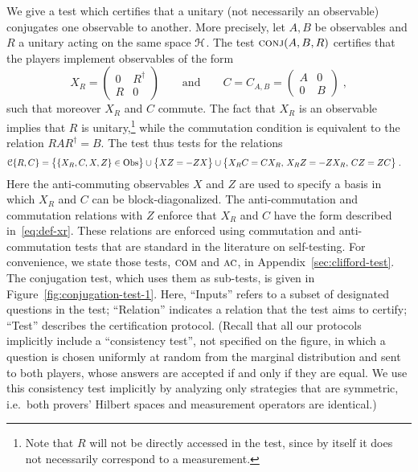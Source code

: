 We give a test which certifies that a unitary (not necessarily an observable) conjugates one observable to another. More precisely, let $A,B$ be observables and $R$ a unitary acting on the same space $\mathcal{H}$. The test $\textsc{conj}(A,B,R)$ certifies that the players implement observables of the form
\begin{equation}\label{eq:def-xr}
X_R = \begin{pmatrix} 0 & R^\dagger\\ R & 0 \end{pmatrix}\qquad \text{and}\qquad C = C_{A,B} = \begin{pmatrix} A & 0\\ 0 & B \end{pmatrix}\;,
\end{equation}
such that moreover $X_R$ and $C$ commute. The fact that $X_R$ is an observable implies that $R$ is unitary,\footnote{Note that $R$ will not be directly accessed in the test, since by itself it does not necessarily correspond to a measurement.} while the commutation condition is equivalent to the relation $RAR^\dagger = B$. The test thus tests for the relations
\begin{align*}
 \mathcal{C}\{R,C\} &= \big\{ \{X_R,C,X,Z\}\in \mathrm{Obs}\big\} \cup \big\{XZ=-ZX\big\}
\cup \big\{ X_R C = C X_R,\, X_RZ=-Z X_R,\, C Z=ZC\big\}\;.
\end{align*}
Here the anti-commuting observables $X$ and $Z$ are used to specify a basis in which $X_R$ and $C$ can be block-diagonalized. The anti-commutation and commutation relations with $Z$ enforce that $X_R$ and $C$ have the form described in~\eqref{eq:def-xr}.
These relations are enforced using commutation and anti-commutation tests that are standard in the literature on self-testing. For convenience, we state those tests, $\textsc{com}$ and $\textsc{ac}$, in Appendix~\ref{sec:clifford-test}. The conjugation test, which uses them as sub-tests, is given in Figure~\ref{fig:conjugation-test-1}. Here, ``Inputs'' refers to a subset of designated questions in the test; ``Relation'' indicates a relation that the test aims to certify; ``Test'' describes the certification protocol. (Recall that all our protocols implicitly include a ``consistency test'', not specified on the figure, in which a question is chosen uniformly at random from the marginal distribution and sent to both players, whose answers are accepted if and only if they are equal. We use this consistency test implicitly by analyzing only strategies that are symmetric, i.e.\ both provers' Hilbert spaces and measurement operators are identical.)

